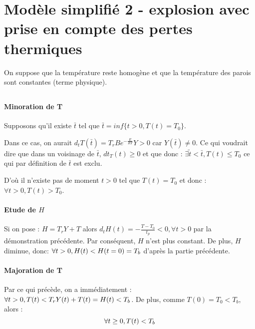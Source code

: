 \documentclass[10pt,a4paper,twocolumn]{report}
\begin{document}
\section{Modèle simplifié 2 - explosion avec prise en compte des pertes thermiques}

On suppose que la température reste homogène et que la température des parois sont constantes (terme physique).

\subsection{}%

\subsubsection{} %

\paragraph{Minoration de T}
Supposons qu'il existe $\bar{t}$ tel que $\bar{t} = inf\{t>0, T(t) = T_0\}$.

Dans ce cas, on aurait $d_tT(\bar{t}) = T_rB e^{-\frac{E}{RT}}Y > 0$ car $Y(\bar{t}) \neq 0$. Ce qui voudrait dire que dans un voisinage de $\bar{t}$, $dt_T(t) \geq 0$ et que donc :
$\exists \tilde{t} < \bar{t}, T(t) \leq T_0$ ce qui par définition de $\bar{t}$ est exclu. 

D'où il n'existe pas de moment $t>0$ tel que $T(t) = T_0$ et donc : $\forall t >0, T(t)>T_0$.

\paragraph{Etude de $H$}

Si on pose : $H = T_r Y + T$ alors $d_tH(t) = -\frac{T-T_0}{t_p} < 0, \forall t>0$ par la démonstration précédente. Par conséquent, $H$ n'est plus constant. De plus, $H$ diminue, donc: $\forall t > 0, \space H(t)< H(t=0) = T_b$ d'après la partie précédente.

\paragraph{Majoration de T}

Par ce qui précède, on a immédiatement : $\forall t > 0, \space T(t) < T_r Y(t)+T(t) = H(t) < T_b$.
De plus, comme $T(0) = T_0 < T_b$, alors : 
$$ \forall t \geq 0, \space T(t) < T_b $$
\end{document}
